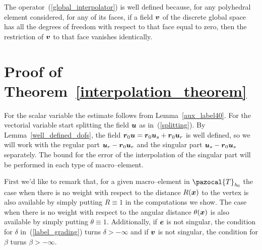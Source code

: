 \begin{remark}
  The operator~(\ref{global_interpolator}) is well defined because, for any
  polyhedral element considered, for any of its faces, if a field $\boldsymbol{v}$ of the discrete
  global space has all
  the
  degrees of freedom with respect to that face equal to zero, then the restriction
  of $\boldsymbol{v}$ to that face vanishes identically.
\end{remark}

\section{Proof of Theorem~\ref{interpolation_theorem}}
For the scalar variable the estimate follows from Lemma~\ref{aux_label40}.
For the vectorial variable start splitting the field $\boldsymbol{u}$ as in~(\ref{splitting}). By 
Lemma~\ref{well_defined_dofs}, the field $\boldsymbol{r}_{0}\boldsymbol{u} = \boldsymbol{r}_0\boldsymbol{u}_s + \boldsymbol{r}_0\boldsymbol{u}_r$ 
is well defined, so we will work 
with the regular part $\boldsymbol{u}_r - \boldsymbol{r}_0\boldsymbol{u}_r$ and the singular part $\boldsymbol{u}_s - \boldsymbol{r}_0\boldsymbol{u}_s$
separately. The bound for the error of the interpolation of the singular part will be 
performed in each type of macro--element.

First we'd like to remark that, for a given macro--element in 
$\pazocal{T}_{\textit{h}_0}$ the case when there is no weight with respect to 
the distance $R(\boldsymbol{x})$
to the vertex is also available by simply putting 
$R\equiv 1$ in the computations we show. The case when there is no weight with 
respect to the angular distance
$\theta(\boldsymbol{x})$ is also available by simply putting 
$\theta\equiv 1.$ Additionally, if $\boldsymbol{e}$ is not singular, the condition for 
$\delta$ in~(\ref{label_grading}) 
turns $\delta > -\infty$ and if $\boldsymbol{v}$ is not singular, the condition for $\beta$
turns $\beta > -\infty.$

